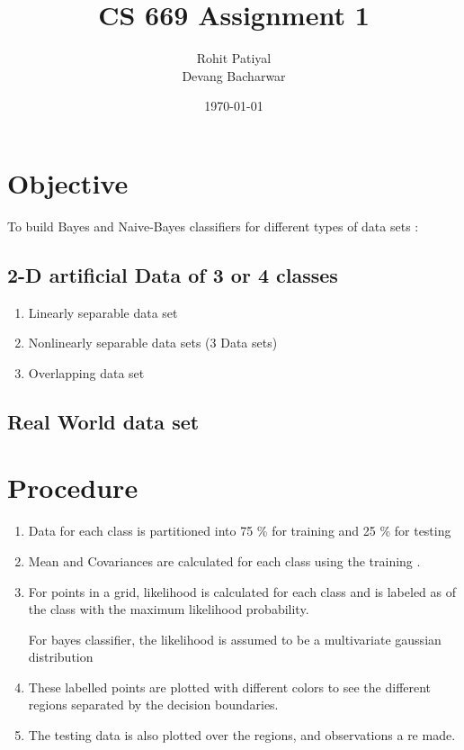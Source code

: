 \documentclass[a4paper]{article}
\title{CS 669 Assignment 1}
\author{Rohit Patiyal \\ Devang Bacharwar}
\date{\today}
\begin{document}
\maketitle

\vspace{2.0cm}

\section {Objective}
	To build Bayes and Naive-Bayes classifiers for different types of data sets :
	\subsection{2-D artificial Data of 3 or 4 classes}
		\begin{enumerate}
		  \item {Linearly separable data set}
		  \item {Nonlinearly separable data sets (3 Data sets)}
		  \item {Overlapping data set}
		\end{enumerate}
	\subsection{Real World data set}

\vspace{1.0cm}

\section{Procedure}
	\begin{enumerate}
	  \item {Data for each class is partitioned into 75 \% for training and 25
	  \% for testing }
	  \item {Mean and Covariances are calculated for each class using the
	  training .}
	  \item {For points in a grid, likelihood is calculated for each class and is
	  labeled as of the class with the maximum likelihood probability.}
	  \par{For bayes classifier, the likelihood is assumed to be a multivariate
	  gaussian distribution }
	  \item {These labelled points are plotted with different colors to see the
	  different regions separated by the decision boundaries.}
	  \item {The testing data is also plotted over the regions, and observations a
	  re made.}
	\end{enumerate}
\vspace{2.0cm}
\end{document}

